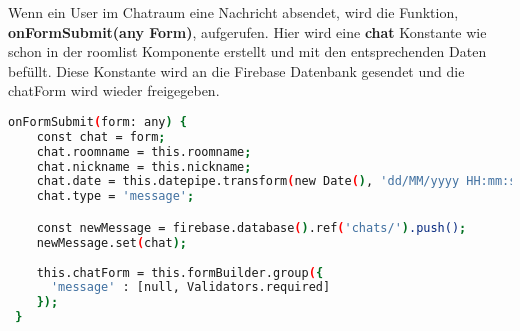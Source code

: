 Wenn ein User im Chatraum eine Nachricht absendet, wird die Funktion, \textbf{onFormSubmit(any Form)}, aufgerufen.
Hier wird eine \textbf{chat} Konstante wie schon in der roomlist Komponente erstellt und mit den entsprechenden Daten befüllt. Diese Konstante wird an die Firebase Datenbank gesendet und die chatForm
wird wieder freigegeben.

\begin{lstlisting}[language=bash]
onFormSubmit(form: any) {
    const chat = form;
    chat.roomname = this.roomname;
    chat.nickname = this.nickname;
    chat.date = this.datepipe.transform(new Date(), 'dd/MM/yyyy HH:mm:ss');
    chat.type = 'message';

    const newMessage = firebase.database().ref('chats/').push();
    newMessage.set(chat);
    
    this.chatForm = this.formBuilder.group({
      'message' : [null, Validators.required]
    });
 }
\end{lstlisting}
\newpage